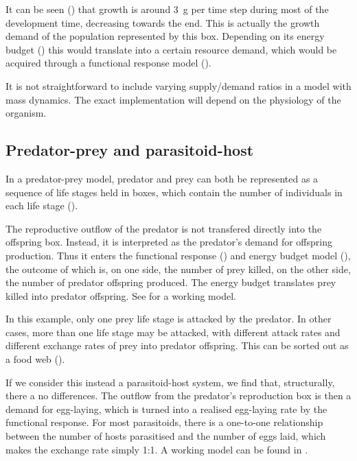 It can be seen () that growth is around \SI{3}{\gram} per time step during most of the development time, decreasing towards the end. This is actually the growth demand of the population represented by this box. Depending on its energy budget () this would translate into a certain resource demand, which would  be acquired through a functional response model ().

It is not straightforward to include varying supply/demand ratios in a model with mass dynamics. The exact implementation will depend on the physiology of the organism.

\subsection {Predator-prey and parasitoid-host}
In a predator-prey model, predator and prey can both be represented as a sequence of life stages held in  boxes, which contain the number of individuals in each life stage (). 

The reproductive outflow of the predator is not transfered directly into the offspring box. Instead, it is interpreted as the predator's demand for offspring production. Thus it enters the functional response () and energy budget model (), the outcome of which is, on one side, the number of prey killed, on the other side, the number of predator offspring produced. The energy budget translates prey killed into predator offspring. See  for a working model.

In this example, only one prey life stage is attacked by the predator. In other cases, more than one life stage may be attacked, with different attack rates and different exchange rates of prey into predator offspring. This can be sorted out as a food web ().

If we consider this instead a parasitoid-host system, we find that, structurally, there a no differences. The outflow from the predator's reproduction box is then a demand for egg-laying, which is turned into a realised egg-laying rate by the functional response. For most parasitoids, there is a one-to-one relationship between the number of hosts parasitised and the number of eggs laid, which makes the exchange rate simply 1:1. A working model can be found in .


